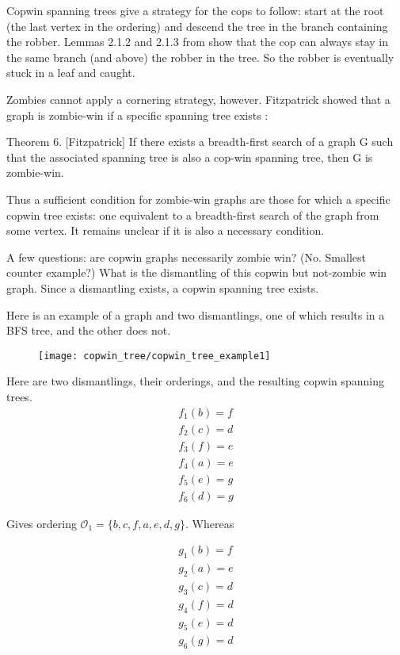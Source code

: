Copwin spanning trees give a strategy for the cops to follow: start at the root
(the last vertex in the ordering) and descend the tree in the branch containing the robber.
Lemmas 2.1.2 and 2.1.3 from \cite{clarke2002constrained} show that the cop
can always stay in the same branch (and above) the robber in the tree. So the
robber is eventually stuck in a leaf and caught.

Zombies cannot apply a cornering strategy, however. Fitzpatrick showed that a
graph is zombie-win if a specific spanning tree exists \cite{fitzpatrick2016deterministic}:

Theorem 6. [Fitzpatrick] If there exists a breadth-first search of a graph G such that the associated spanning tree is also a cop-win spanning tree, then G is zombie-win.

Thus a sufficient condition for zombie-win graphs are those for which a specific copwin tree exists: one equivalent to a breadth-first search of the graph from some vertex. It remains unclear if it is also a necessary condition.

A few questions: are copwin graphs necessarily zombie win? (No. Smallest counter example?)
What is the dismantling of this copwin but not-zombie win graph. Since a dismantling exists,
a copwin spanning tree exists.

Here is an example of a graph and two dismantlings, one of which results in a BFS tree,
and the other does not.

\begin{figure}[h!]
\centering
\texttt{[image: copwin\_tree/copwin\_tree\_example1]}
\end{figure}

Here are two dismantlings, their orderings, and the resulting copwin spanning trees.
\begin{align*}
  f_1(b) = f \\
  f_2(c) = d \\
  f_3(f) = e \\
  f_4(a) = e \\
  f_5(e) = g \\
  f_6(d) = g
\end{align*}

Gives ordering $\mathcal{O}_1 = \{ b, c, f, a, e, d, g \}$. Whereas

\begin{align*}
  g_1(b) = f \\
  g_2(a) = e \\
  g_3(c) = d \\
  g_4(f) = d \\
  g_5(e) = d \\
  g_6(g) = d
\end{align*}

